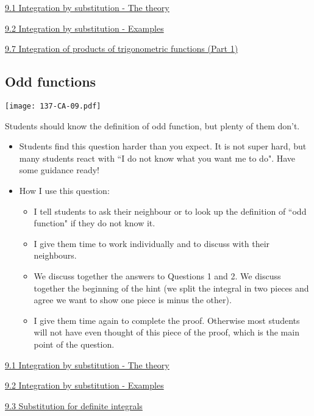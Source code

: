 \documentclass[11pt]{article}
\newcommand{\nl}{\hfill \vspace{-1.1\baselineskip}} %
\newcommand{\vi}{\hspace{8mm} \href{https://www.youtube.com/watch?v=6IiHC3-E3kQ&list=PLlwePzQY_wW_DPAQSBjQmMs0hF8T7yVkF&index=1}{9.1 Integration by substitution - The theory}}
\newcommand{\vii}{\hspace{8mm} \href{https://www.youtube.com/watch?v=dS50LonV_ms&list=PLlwePzQY_wW_DPAQSBjQmMs0hF8T7yVkF&index=2}{9.2 Integration by substitution - Examples}}
\newcommand{\viii}{\hspace{8mm} \href{https://www.youtube.com/watch?v=9WkYb_fRoG0&list=PLlwePzQY_wW_DPAQSBjQmMs0hF8T7yVkF&index=3}{9.3 Substitution for definite integrals}}
\newcommand{\vvii}{\hspace{8mm} \href{https://www.youtube.com/watch?v=8TCGSagLskc&list=PLlwePzQY_wW_DPAQSBjQmMs0hF8T7yVkF&index=7}{9.7 Integration of products of trigonometric functions (Part 1)}}
\begin{document}
\begin{videos}
\vi

\vii

\vvii
\end{videos}

\newpage
\subsection{Odd functions}

\begin{center}
{ \texttt{[image: 137-CA-09.pdf]}} 
\end{center}

\begin{warning}
	Students should know the definition of odd function, but plenty of them don't.
\end{warning}

\begin{comments}
\nl
	\begin{itemize}
		\item Students find this question harder than you expect.  It is not super hard, but many students react with ``I do not know what you want me to do".  Have some guidance ready!
		\item How I use this question:
			\begin{itemize}
				\item I tell students to ask their neighbour or to look up the definition of ``odd function" if they do not know it.
				\item I give them time to work individually and to discuss with their neighbours.
				\item We discuss together the answers to Questions 1 and 2.  We discuss together the beginning of the hint (we split the integral in two pieces and agree we want to show one piece is minus the other).
				\item I give them time again to complete the proof.  Otherwise most students will not have even thought of this piece of the proof, which is the main point of the question.
			\end{itemize}
	\end{itemize}
\end{comments}

\begin{videos}
\vi

\vii

\viii
\end{videos}
\end{document}
